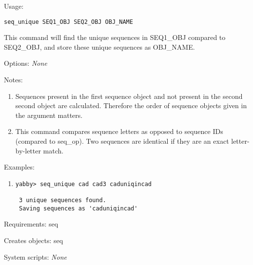 \begin{description}


\item{Usage:}

{\tt seq\_unique SEQ1\_OBJ SEQ2\_OBJ OBJ\_NAME}

This command will find the unique sequences in SEQ1\_OBJ compared
to SEQ2\_OBJ, and store these unique sequences as OBJ\_NAME.


\item{Options:} {\em None}


\item{Notes:}
\begin{enumerate}
\item Sequences present in the first sequence object and not present
 in the second second object are calculated. Therefore the order
 of sequence objects given in the argument matters.
\item This command compares sequence letters as opposed to sequence
 IDs (compared to seq\_op). Two sequences are identical if they
 are an exact letter-by-letter match.
\end{enumerate}


\item{Examples:}
\begin{enumerate}

\item
\begin{verbatim}
yabby> seq_unique cad cad3 caduniqincad

 3 unique sequences found.
 Saving sequences as 'caduniqincad'

\end{verbatim}

\end{enumerate}


\item{Requirements:} seq


\item{Creates objects:} seq


\item{System scripts:} {\em None}

\end{description}


